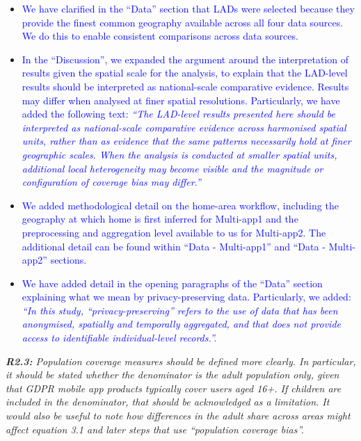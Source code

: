 \documentclass[
  letterpaper,
  DIV=11,
  numbers=noendperiod]{scrartcl}
\begin{document}
\vspace{-3mm} \begin{itemize}[noitemsep, topsep=0pt]
\item \textcolor{blue}{We have clarified in the ``Data'' section that LADs were selected because they provide the finest common geography available across all four data sources. We do this to enable consistent comparisons across data sources.}
\item \textcolor{blue}{In the ``Discussion'', we expanded the argument around the interpretation of results given the spatial scale for the analysis, to explain that the LAD-level results should be interpreted as national-scale comparative evidence. Results may differ when analysed at finer spatial resolutions. Particularly, we have added the following text: \textit{``The LAD-level results presented here should be interpreted as national-scale comparative evidence across harmonised spatial units, rather than as evidence that the same patterns necessarily hold at finer geographic scales. When the analysis is conducted at smaller spatial units, additional local heterogeneity may become visible and the magnitude or configuration of coverage bias may differ.''}}
\item \textcolor{blue}{We added methodological detail on the home-area workflow, including the geography at which home is first inferred for Multi-app1 and the preprocessing and aggregation level available to us for Multi-app2. The additional detail can be found within ``Data - Multi-app1'' and ``Data - Multi-app2'' sections.}
\item \textcolor{blue}{ We have added detail in the opening paragraphs of the ``Data'' section explaining what we mean by privacy-preserving data. Particularly, we added: \textit{``In this study, “privacy-preserving” refers to the use of data that has been anonymised, spatially and temporally aggregated, and that does not provide access to identifiable individual-level records.''.}}
\end{itemize}

\setlength{\leftskip}{0cm}\textit{\textbf{R2.3:} Population coverage measures should be defined more clearly. In particular, it should be stated whether the denominator is the adult population only, given that GDPR mobile app products typically cover users aged 16+. If children are included in the denominator, that should be acknowledged as a limitation. It would also be useful to note how differences in the adult share across areas might affect equation 3.1 and later steps that use ``population coverage bias''.}
\end{document}
